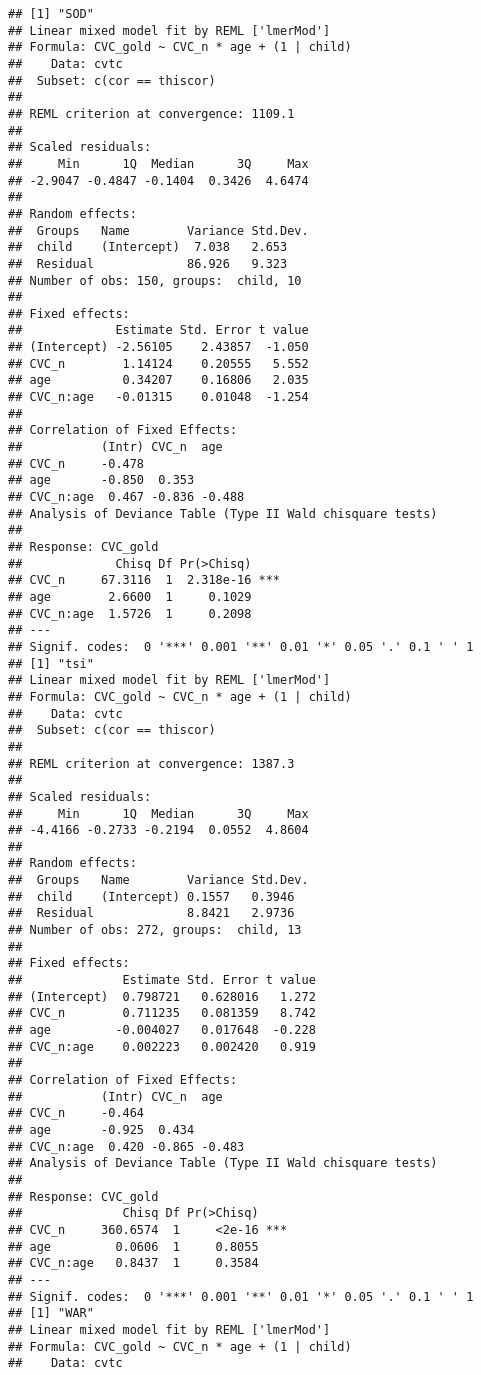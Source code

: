 \documentclass[english,floatsintext,man]{apa6}
\begin{document}
\begin{verbatim}
## [1] "SOD"
## Linear mixed model fit by REML ['lmerMod']
## Formula: CVC_gold ~ CVC_n * age + (1 | child)
##    Data: cvtc
##  Subset: c(cor == thiscor)
## 
## REML criterion at convergence: 1109.1
## 
## Scaled residuals: 
##     Min      1Q  Median      3Q     Max 
## -2.9047 -0.4847 -0.1404  0.3426  4.6474 
## 
## Random effects:
##  Groups   Name        Variance Std.Dev.
##  child    (Intercept)  7.038   2.653   
##  Residual             86.926   9.323   
## Number of obs: 150, groups:  child, 10
## 
## Fixed effects:
##             Estimate Std. Error t value
## (Intercept) -2.56105    2.43857  -1.050
## CVC_n        1.14124    0.20555   5.552
## age          0.34207    0.16806   2.035
## CVC_n:age   -0.01315    0.01048  -1.254
## 
## Correlation of Fixed Effects:
##           (Intr) CVC_n  age   
## CVC_n     -0.478              
## age       -0.850  0.353       
## CVC_n:age  0.467 -0.836 -0.488
## Analysis of Deviance Table (Type II Wald chisquare tests)
## 
## Response: CVC_gold
##             Chisq Df Pr(>Chisq)    
## CVC_n     67.3116  1  2.318e-16 ***
## age        2.6600  1     0.1029    
## CVC_n:age  1.5726  1     0.2098    
## ---
## Signif. codes:  0 '***' 0.001 '**' 0.01 '*' 0.05 '.' 0.1 ' ' 1
## [1] "tsi"
## Linear mixed model fit by REML ['lmerMod']
## Formula: CVC_gold ~ CVC_n * age + (1 | child)
##    Data: cvtc
##  Subset: c(cor == thiscor)
## 
## REML criterion at convergence: 1387.3
## 
## Scaled residuals: 
##     Min      1Q  Median      3Q     Max 
## -4.4166 -0.2733 -0.2194  0.0552  4.8604 
## 
## Random effects:
##  Groups   Name        Variance Std.Dev.
##  child    (Intercept) 0.1557   0.3946  
##  Residual             8.8421   2.9736  
## Number of obs: 272, groups:  child, 13
## 
## Fixed effects:
##              Estimate Std. Error t value
## (Intercept)  0.798721   0.628016   1.272
## CVC_n        0.711235   0.081359   8.742
## age         -0.004027   0.017648  -0.228
## CVC_n:age    0.002223   0.002420   0.919
## 
## Correlation of Fixed Effects:
##           (Intr) CVC_n  age   
## CVC_n     -0.464              
## age       -0.925  0.434       
## CVC_n:age  0.420 -0.865 -0.483
## Analysis of Deviance Table (Type II Wald chisquare tests)
## 
## Response: CVC_gold
##              Chisq Df Pr(>Chisq)    
## CVC_n     360.6574  1     <2e-16 ***
## age         0.0606  1     0.8055    
## CVC_n:age   0.8437  1     0.3584    
## ---
## Signif. codes:  0 '***' 0.001 '**' 0.01 '*' 0.05 '.' 0.1 ' ' 1
## [1] "WAR"
## Linear mixed model fit by REML ['lmerMod']
## Formula: CVC_gold ~ CVC_n * age + (1 | child)
##    Data: cvtc

\end{verbatim}
\end{document}
